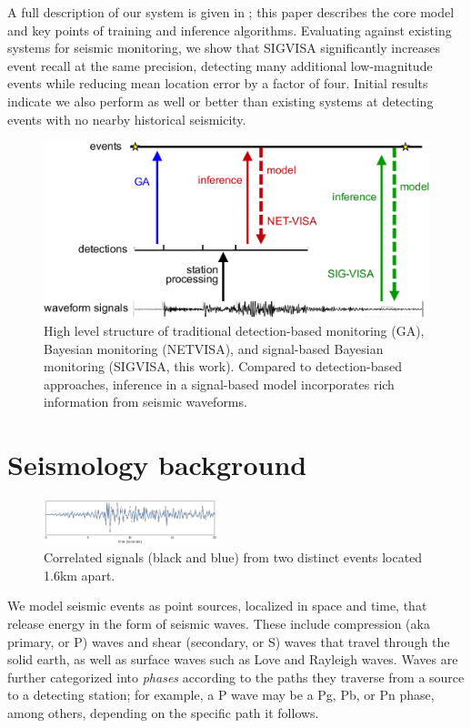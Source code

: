 \documentclass[twoside]{article} \usepackage{aistats2017}
\newcommand{\todo}[1]{{\color{red} \textbf{TODO:} {#1}}}
\begin{document}
A full description of our system is given in \citet{moore2016signal};
this paper describes the core model and key points of training and
inference algorithms. Evaluating against existing systems for seismic
monitoring, we show that SIGVISA significantly increases event recall
at the same precision, detecting many additional low-magnitude events
while reducing mean location error by a factor of four. Initial
results indicate we also perform as well or better than existing
systems at detecting events with no nearby historical seismicity.

\begin{figure}
\centering
\includegraphics[width=.45\textwidth]{netvisa_sigvisa-crop}
\caption{High level structure of traditional detection-based monitoring (GA),
  Bayesian monitoring (NETVISA), and signal-based
  Bayesian monitoring (SIGVISA, this work). Compared to
  detection-based approaches, inference in a signal-based model
  incorporates rich information from seismic waveforms.}
\label{fig:monitoring_comparison}
\end{figure}


\section{Seismology background}


\begin{figure}
\centering
    \includegraphics[width=0.45\textwidth]{xc_alignment}
    \caption{Correlated signals (black and blue) from two distinct events located 1.6km apart.}
    \label{fig:xcalign}
\end{figure}

\vspace{-.5em}
We model seismic events as point sources, localized in space and time,
that release energy in the form of seismic waves. These include
compression (aka primary, or P) waves and shear (secondary, or S) waves that
travel through the solid earth, as well as surface waves such as
Love and Rayleigh waves. Waves are further categorized
into {\em phases} according to the paths they traverse from a source
to a detecting station; for example, a P wave may be a Pg, Pb, or Pn phase, among others, depending on the specific path it
follows. 
\end{document}
